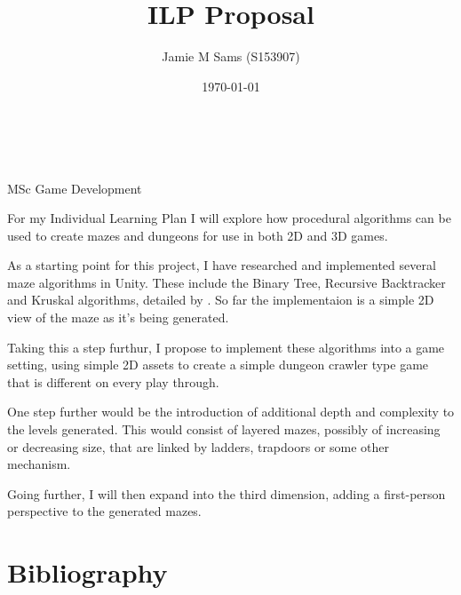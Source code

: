 \documentclass[a4paper, 12pt]{article}
\title{ILP Proposal}
\author{Jamie M Sams (S153907)}
\date{\today}
\begin{document}

\begin{titlepage}
	\vspace*{\fill}
	\centering
	{\huge \thetitle}\\[.5cm]
	{\large \theauthor}\\[.5cm]
	{MSc Game Development}
	\vspace*{\fill}
\end{titlepage}

\lhead{\theauthor}

For my Individual Learning Plan I will explore how procedural algorithms can be used to create mazes and dungeons for use in both 2D and 3D games.

As a starting point for this project, I have researched and implemented several maze algorithms in Unity.  These include the Binary Tree, Recursive Backtracker and Kruskal algorithms, detailed by \cite{Buck2015}.  So far the implementaion is a simple 2D view of the maze as it's being generated.

Taking this a step furthur, I propose to implement these algorithms into a game setting, using simple 2D assets to create a simple dungeon crawler type game that is different on every play through.

One step further would be the introduction of additional depth and complexity to the levels generated.  This would consist of layered mazes, possibly of increasing or decreasing size, that are linked by ladders, trapdoors or some other mechanism.

Going further, I will then expand into the third dimension, adding a first-person perspective to the generated mazes.

\pagebreak
\section*{Bibliography}

\printbibliography[heading=none]
\end{document}
